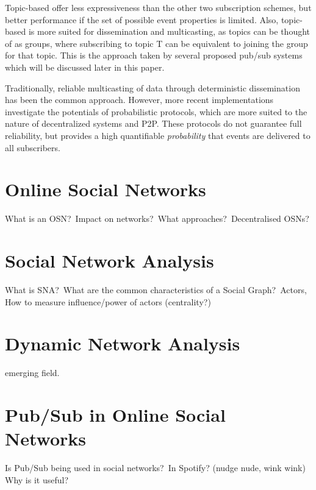 Topic-based offer less expressiveness than the other two subscription
schemes, but better performance if the set of possible event properties
is limited. Also, topic-based is more suited for dissemination and
multicasting, as topics can be thought of as groups, where subscribing
to topic T can be equivalent to joining the group for that topic. This
is the approach taken by several proposed pub/sub systems which will be
discussed later in this paper.

Traditionally, reliable multicasting of data through deterministic
dissemination has been the common approach. However, more recent
implementations investigate the potentials of probabilistic protocols,
which are more suited to the nature of decentralized systems and P2P.
These protocols do not guarantee full reliability, but provides a high
quantifiable \emph{probability} that events are delivered to all
subscribers.

\section{Online Social Networks}
What is an OSN?\ Impact on networks?\ What approaches?\ Decentralised OSNs?
\section{Social Network Analysis}
What is SNA?\ What are the common characteristics of a Social Graph?\
Actors, How to measure influence/power of actors (centrality?)
\section{Dynamic Network Analysis}
emerging field.
\section{Pub/Sub in Online Social Networks}
Is Pub/Sub being used in social networks?\, In Spotify? (nudge nude, wink wink) Why is it
useful?\
